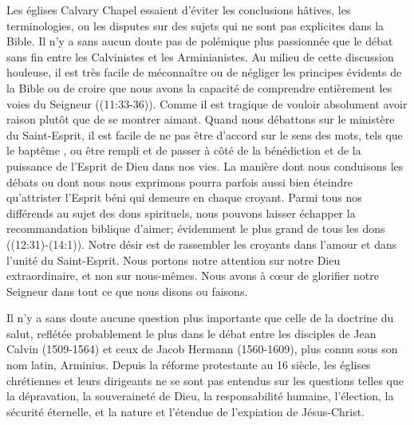 Les églises Calvary Chapel essaient d'éviter les conclusions hâtives, les terminologies,
 ou les disputes
 sur des sujets qui ne sont pas explicites dans la Bible.
 Il n'y a sans aucun doute pas de polémique plus passionnée que le débat sans fin
 entre les Calvinistes et les Arminianistes. Au milieu de cette discussion houleuse,
 il est très facile de méconnaître ou de négliger les principes évidents de la Bible
 ou de croire que nous avons la capacité de comprendre entièrement les voies du Seigneur
 ((11:33-36)).
 Comme il est tragique de vouloir absolument avoir raison plutôt que de se montrer aimant.
 Quand nous débattons sur le ministère du Saint-Esprit, il est facile de ne pas être d'accord
 sur le sens des mots, tels que le \og baptême \fg{} , ou \og être rempli \fg{} 
 et de passer à côté de la bénédiction et de la puissance de l'Esprit de Dieu dans nos vies.
 La manière dont nous conduisons les débats ou dont nous nous exprimons pourra parfois
 aussi bien \og éteindre \fg{}  qu'\og attrister\fg{} 
 l'Esprit béni qui demeure en chaque croyant.
 Parmi tous nos différends au sujet des dons spirituels,
 nous pouvons laisser échapper la recommandation biblique d'aimer;
 évidemment le plus grand de tous les dons ((12:31)-(14:1)).
 Notre désir est de rassembler les croyants dans l'amour et dans l'unité du Saint-Esprit.
 Nous portons notre attention sur notre Dieu extraordinaire, et non sur nous-mêmes.
 Nous avons à cœur de glorifier notre Seigneur dans tout ce que nous disons ou faisons.

Il n'y a sans doute aucune question plus importante que celle de la doctrine du salut,
 reflétée probablement le plus dans le débat entre les disciples de Jean Calvin (1509-1564)
 et ceux de Jacob Hermann (1560-1609), plus connu sous son nom latin, Arminius.
 Depuis la réforme protestante au 16 siècle, les églises chrétiennes
 et leurs dirigeants ne se sont pas entendus sur les questions telles que la dépravation,
 la souveraineté de Dieu, la responsabilité humaine, l'élection, la sécurité éternelle,
 et la nature et l'étendue de l'expiation de Jésus-Christ.

